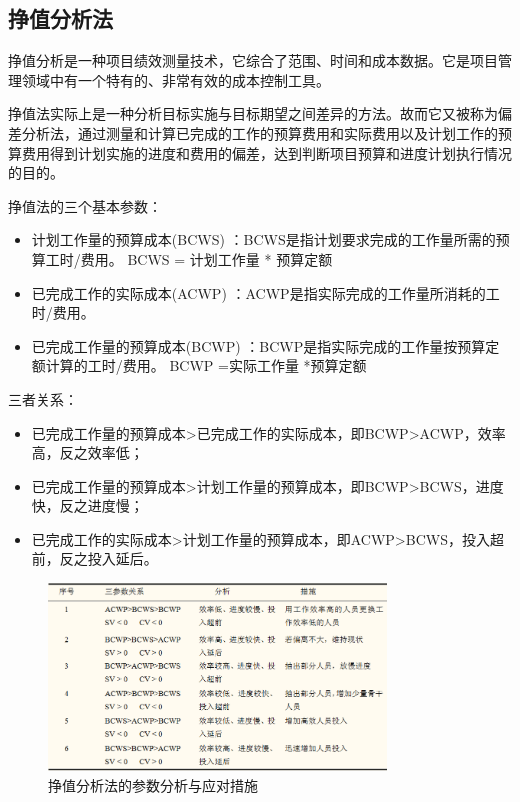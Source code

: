 \subsection{挣值分析法}
挣值分析是一种项目绩效测量技术，它综合了范围、时间和成本数据。它是项目管理领域中有一个特有的、非常有效的成本控制工具。
\par 挣值法实际上是一种分析目标实施与目标期望之间差异的方法。故而它又被称为偏差分析法，通过测量和计算已完成的工作的预算费用和实际费用以及计划工作的预算费用得到计划实施的进度和费用的偏差，达到判断项目预算和进度计划执行情况的目的。
\par 挣值法的三个基本参数：
\begin{itemize}
	\item 计划工作量的预算成本(BCWS) ：BCWS是指计划要求完成的工作量所需的预算工时/费用。 
	\subitem BCWS = 计划工作量 * 预算定额
	\item 已完成工作的实际成本(ACWP) ：ACWP是指实际完成的工作量所消耗的工时/费用。
	\item 已完成工作量的预算成本(BCWP) ：BCWP是指实际完成的工作量按预算定额计算的工时/费用。 
	\subitem BCWP =实际工作量 *预算定额
\end{itemize}
三者关系：
\begin{itemize}
	\item 已完成工作量的预算成本>已完成工作的实际成本，即BCWP>ACWP，效率高，反之效率低；
	\item 已完成工作量的预算成本>计划工作量的预算成本，即BCWP>BCWS，进度快，反之进度慢；
	\item 已完成工作的实际成本>计划工作量的预算成本，即ACWP>BCWS，投入超前，反之投入延后。
\end{itemize}

\begin{figure}[!h]
	\centering
	\includegraphics[width=0.8\textwidth]{image/6-3}
	\caption{挣值分析法的参数分析与应对措施}
\end{figure}
